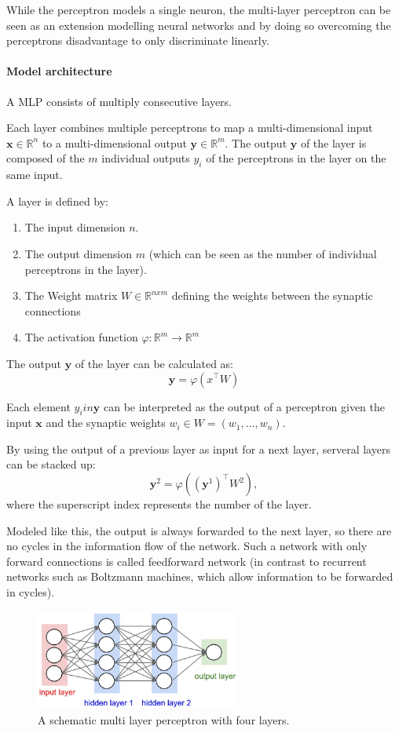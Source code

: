 While the perceptron models a single neuron, the multi-layer perceptron can be seen as an extension modelling neural networks and by doing so overcoming the perceptrons disadvantage to only discriminate linearly. 

\paragraph{Model architecture}

A MLP consists of multiply consecutive layers.

Each layer combines multiple perceptrons to map a multi-dimensional input $\textbf{x} \in \mathbb{R}^n$ to a multi-dimensional output $\textbf{y} \in \mathbb{R}^m$.
The output $\textbf{y}$ of the layer is composed of the $m$ individual outputs $y_i$ of the perceptrons in the layer on the same input.


A layer is defined by:
\begin{enumerate}
	\item The input dimension $n$.
	\item The output dimension $m$ (which can be seen as the number of individual perceptrons in the layer).
	\item The Weight matrix $W \in \mathbb{R}^{nxm} $ defining the weights between the synaptic connections
	\item The activation function $\varphi : \mathbb{R}^m \rightarrow \mathbb{R}^m $
\end{enumerate}

The output $\textbf{y}$ of the layer can be calculated as:
\[
\textbf{y} = \varphi(x^\intercal W)
\]

Each element $y_i in \textbf{y}$ can be interpreted as the output of a perceptron given the input $\textbf{x}$ and the synaptic weights $w_i \in W = (w_1, ... , w_n)$.

By using the output of a previous layer as input for a next layer, serveral layers can be stacked up: 
\[
\textbf{y}^2 = \varphi ((\textbf{y}^1)^\intercal W^2 ) ,
\]
where the superscript index represents the number of the layer. 

Modeled like this, the output is always forwarded to the next layer, so there are no cycles in the information flow of the network.
Such a network with only forward connections is called feedforward network (in contrast to recurrent networks such as Boltzmann machines, which allow information to be forwarded in cycles).

\begin{figure}
	\centering
    	\includegraphics[width=0.6\textwidth]{imgs/mlp.jpeg} 
    \caption{A schematic multi layer perceptron with four layers.}
	\label{fig:mlp}
\end{figure}



